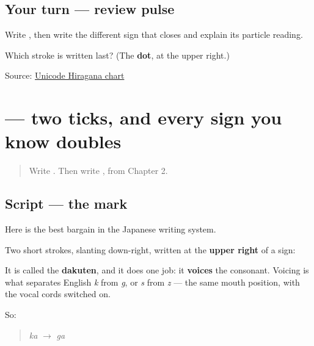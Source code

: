 \subsection*{Your turn — review pulse}
Write \textbf{}, then write the different sign that closes \textbf{} and explain its particle reading.

\begin{tcolorbox}[breakable,colback=teal!4,colframe=teal!35!black,title={Before you move on}]
Which stroke is written last? (The \textbf{dot}, at the upper right.)

Source: \href{https://www.unicode.org/charts/PDF/U3040.pdf}{Unicode Hiragana chart}
\end{tcolorbox}
\section[\texorpdfstring{\ja{゛} (dakuten)}{゛ (dakuten)}]{— two ticks, and every sign you know doubles}

\label{lesson:JA-W03-dakuten}



\begin{quote}
Write . Then write , from Chapter 2.
\end{quote}

\subsection*{Script — the mark}

Here is the best bargain in the Japanese writing system.

Two short strokes, slanting down-right, written at the \textbf{upper right} of a sign:

\begin{quote}
\end{quote}

It is called the \textbf{dakuten}, and it does one job: it \textbf{voices} the consonant. Voicing is what separates English \emph{k} from \emph{g}, or \emph{s} from \emph{z} — the same mouth position, with the vocal cords switched on.

So:

\begin{quote}
 \emph{ka} $\to$ \textbf{} \emph{ga}
\end{quote}


